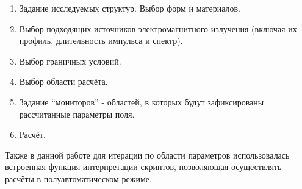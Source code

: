 \begin{enumerate}[label=\arabic*)]
	\item Задание исследуемых структур. Выбор форм и материалов.
	\item Выбор подходящих источников электромагнитного излучения (включая их профиль, длительность импульса и спектр).
	\item Выбор граничных условий.
	\item Выбор области расчёта.
	\item Задание ``мониторов'' - областей, в которых будут зафиксированы рассчитанные параметры поля.
	\item Расчёт.
\end{enumerate}

Также в данной работе для итерации по области параметров использовалась встроенная функция интерпретации скриптов, позволяющая осуществлять расчёты в полуавтоматическом режиме.

























